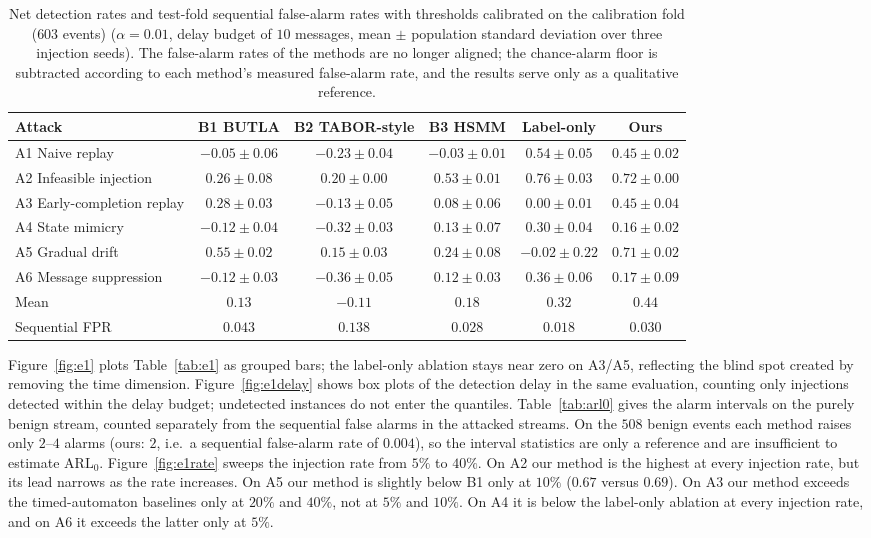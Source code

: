 \documentclass[manuscript,screen,review]{acmart}
\begin{document}
\begin{table}[!t]
\renewcommand{\arraystretch}{1.15}
\caption{Net detection rates and test-fold sequential false-alarm rates with thresholds calibrated on the calibration fold ($603$ events) ($\alpha=0.01$, delay budget of $10$ messages, mean $\pm$ population standard deviation over three injection seeds). The false-alarm rates of the methods are no longer aligned; the chance-alarm floor is subtracted according to each method's measured false-alarm rate, and the results serve only as a qualitative reference.}
\label{tab:e1calib}
\centering
\scriptsize
\begin{tabular}{lccccc}
\toprule
Attack & {B1} {BUTLA} & {B2} {TABOR}-style & {B3} {HSMM} & Label-only & Ours \\
\midrule
{A1} Naive replay & $-0.05{\pm}0.06$ & $-0.23{\pm}0.04$ & $-0.03{\pm}0.01$ & $0.54{\pm}0.05$ & $0.45{\pm}0.02$ \\
{A2} Infeasible injection & $0.26{\pm}0.08$ & $0.20{\pm}0.00$ & $0.53{\pm}0.01$ & $0.76{\pm}0.03$ & $0.72{\pm}0.00$ \\
{A3} Early-completion replay & $0.28{\pm}0.03$ & $-0.13{\pm}0.05$ & $0.08{\pm}0.06$ & $0.00{\pm}0.01$ & $0.45{\pm}0.04$ \\
{A4} State mimicry & $-0.12{\pm}0.04$ & $-0.32{\pm}0.03$ & $0.13{\pm}0.07$ & $0.30{\pm}0.04$ & $0.16{\pm}0.02$ \\
{A5} Gradual drift & $0.55{\pm}0.02$ & $0.15{\pm}0.03$ & $0.24{\pm}0.08$ & $-0.02{\pm}0.22$ & $0.71{\pm}0.02$ \\
{A6} Message suppression & $-0.12{\pm}0.03$ & $-0.36{\pm}0.05$ & $0.12{\pm}0.03$ & $0.36{\pm}0.06$ & $0.17{\pm}0.09$ \\
\midrule
Mean & $0.13$ & $-0.11$ & $0.18$ & $0.32$ & $0.44$ \\
Sequential FPR & $0.043$ & $0.138$ & $0.028$ & $0.018$ & $0.030$ \\
\bottomrule
\end{tabular}
\end{table}

Figure~\ref{fig:e1} plots Table~\ref{tab:e1} as grouped bars; the label-only ablation stays near zero on {A3}/{A5}, reflecting the blind spot created by removing the time dimension. Figure~\ref{fig:e1delay} shows box plots of the detection delay in the same evaluation, counting only injections detected within the delay budget; undetected instances do not enter the quantiles. Table~\ref{tab:arl0} gives the alarm intervals on the purely benign stream, counted separately from the sequential false alarms in the attacked streams. On the $508$ benign events each method raises only $2$--$4$ alarms (ours: $2$, i.e.\ a sequential false-alarm rate of $0.004$), so the interval statistics are only a reference and are insufficient to estimate $\mathrm{ARL}_0$. Figure~\ref{fig:e1rate} sweeps the injection rate from $5\%$ to $40\%$. On {A2} our method is the highest at every injection rate, but its lead narrows as the rate increases. On {A5} our method is slightly below {B1} only at $10\%$ ($0.67$ versus $0.69$). On {A3} our method exceeds the timed-automaton baselines only at $20\%$ and $40\%$, not at $5\%$ and $10\%$. On {A4} it is below the label-only ablation at every injection rate, and on {A6} it exceeds the latter only at $5\%$.
\end{document}
